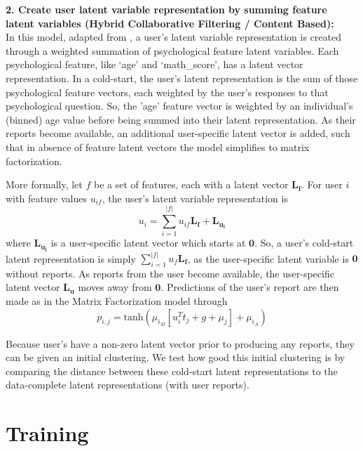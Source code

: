 \documentclass{article}
\begin{document}
\noindent\textbf{2. Create user latent variable representation by summing feature latent variables (Hybrid Collaborative Filtering / Content Based):} \\ In this model, adapted from \citep{kula2015metadata}, a user's latent variable representation is created through a weighted summation of psychological feature latent variables. Each psychological feature, like `age' and `math\_score', has a latent vector representation. In a cold-start, the user's latent representation is the sum of those psychological feature vectors, each weighted by the user's responses to that psychological question. So, the 'age' feature vector is weighted by an individual's (binned) age value before being summed into their latent representation. As their reports become available, an additional user-specific latent vector is added, such that in absence of feature latent vectors the model simplifies to matrix factorization. 

More formally, let $f$ be a set of features, each with a latent vector $\mathbf{L_{f}}$. For user $i$ with feature values $u_{if}$, the user's latent variable representation is $$u_{i} = \sum_{i=1}^{\vert f \vert} u_{if} \mathbf{L_{f}} + \mathbf{L_{u_{i}}}$$ where $\mathbf{L_{u_{i}}}$ is a user-specific latent vector which starts at $\mathbf{0}$. So, a user's cold-start latent representation is simply $\sum_{i=1}^{\vert f \vert} u_{f} \mathbf{L_{f}}$, as the user-specific latent variable is $\mathbf{0}$ without reports. As reports from the user become available, the user-specific latent vector $\mathbf{L_{u}}$ moves away from $\mathbf{0}$. Predictions of the user's report are then made as in the Matrix Factorization model through  
$$
  p_{i,j} = \textrm{tanh}\left( \mu_{i_M}\left[u_i^{T}t_j + g + \mu_j\right] + \mu_{i_A}\right)
 $$

Because user's have a non-zero latent vector prior to producing any reports, they can be given an initial clustering. We test how good this initial clustering is by comparing the distance between these cold-start latent representations to the data-complete latent representations (with user reports).

\section{Training}\label{sec:training}

%
%
\end{document}
